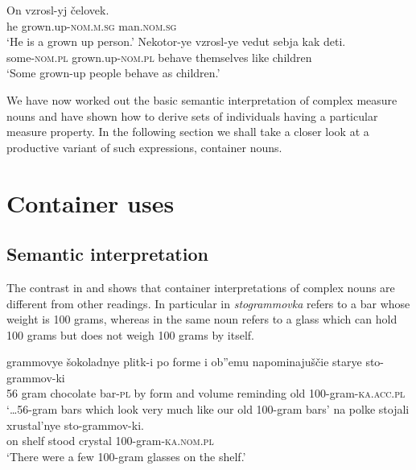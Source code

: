 \documentclass[output=paper,
colorlinks,
citecolor=brown,
newtxmath
]{langscibook}
\begin{document}
\ea\label{ex:khrizmann:19}
    \ea\label{ex:khrizmann:19a} \gll On vzrosl-yj čelovek.\\
    he grown.up-\textsc{nom.m.sg} man.\textsc{nom.sg}\\
    \glt `He is a grown up person.'
    \ex\label{ex:khrizmann:19b} \gll Nekotor-ye vzrosl-ye vedut sebja kak deti.\\
    some-\textsc{nom.pl} grown.up-\textsc{nom.pl} behave themselves like children\\
    \glt `Some grown-up people behave as children.'
\z\z

\noindent We have now worked out the basic semantic interpretation of complex measure nouns and have shown how to derive sets of individuals having a particular measure property. In the following section we shall take a closer look at a productive variant of such expressions, container nouns.

%
%

\section{Container uses}\label{sec:4}
\subsection{Semantic interpretation}\label{sec:4.1}

The contrast in  and  shows that container interpretations of complex nouns are different from other readings. In particular in  \textit{stogrammovka} refers to a bar whose weight is 100 grams, whereas in  the same noun refers to a glass which can hold 100 grams but does not weigh 100 grams by itself.

\ea\label{ex:khrizmann:20}
    \ea\label{ex:khrizmann:20a}  grammovye šokoladnye plitk-i po forme i ob''emu napominajuščie starye sto-grammov-ki\\
    56 gram chocolate bar-\textsc{pl} by form and volume reminding old 100-gram-\textsc{ka.acc.pl}\\
    \glt `\dots 56-gram bars which look very much like our old 100-gram bars'
    \ex\label{ex:khrizmann:20b} \gll na polke stojali xrustal'nye sto-grammov-ki.\\
    on shelf stood crystal 100-gram-\textsc{ka.nom.pl}\\
    \glt `There were a few 100-gram glasses on the shelf.'
\z\z
\end{document}
